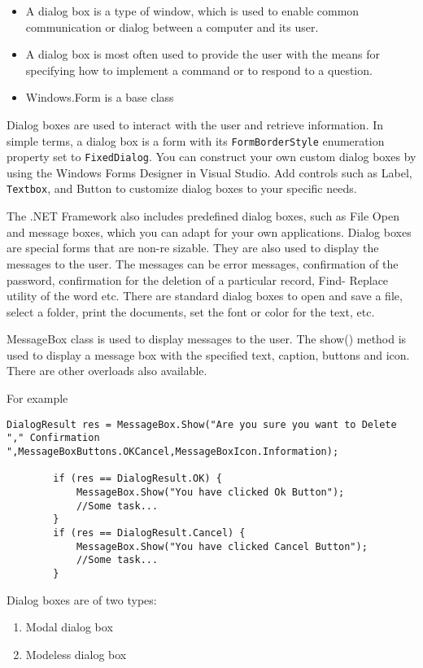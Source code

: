 \begin{itemize}
	\item A dialog box is a type of window, which is used to enable common communication or dialog
	between a computer and its user.
	\item A dialog box is most often used to provide the user with the means for specifying how to
	implement a command or to respond to a question.
	\item Windows.Form is a base class
\end{itemize}
Dialog boxes are used to interact with the user and retrieve information. In simple terms, a dialog
box is a form with its \texttt{FormBorderStyle} enumeration property set to \texttt{FixedDialog}. You can
construct your own custom dialog boxes by using the Windows Forms Designer in Visual Studio.
Add controls such as Label, \texttt{Textbox}, and Button to customize dialog boxes to your specific
needs.

The .NET Framework also includes predefined dialog boxes, such as File Open and message
boxes, which you can adapt for your own applications. Dialog boxes are special forms that are non-re sizable. They are also used to display the messages to the user. The messages can be error
messages, confirmation of the password, confirmation for the deletion of a particular record, Find-
Replace utility of the word etc. There are standard dialog boxes to open and save a file, select a
folder, print the documents, set the font or color for the text, etc.

MessageBox class is used to display messages to the user. The show() method is used to display a
message box with the specified text, caption, buttons and icon. There are other overloads also
available.

For example
\begin{lstlisting}[numbers=none]
DialogResult res = MessageBox.Show("Are you sure you want to Delete "," Confirmation ",MessageBoxButtons.OKCancel,MessageBoxIcon.Information);
	
		if (res == DialogResult.OK) {
			MessageBox.Show("You have clicked Ok Button");
			//Some task...
		}
		if (res == DialogResult.Cancel) {
			MessageBox.Show("You have clicked Cancel Button");
			//Some task...
		}	
\end{lstlisting}
Dialog boxes are of two types:
\begin{enumerate}
	\item Modal dialog box
	\item Modeless dialog box
\end{enumerate}


